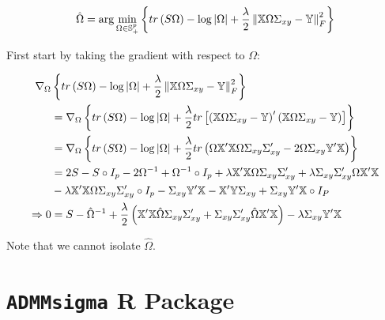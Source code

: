 \documentclass[11pt,]{report}
\theoremstyle{definition}
\theoremstyle{definition}
\theoremstyle{definition}
\theoremstyle{remark}
\begin{document}
\begin{equation}
\hat{\Omega} = \arg\min_{\Omega \in \mathbb{S}_{+}^{p}}\left\{ tr\left(S\Omega\right) - \log\left|\Omega\right| + \frac{\lambda}{2}\left\|\mathbb{X}\Omega\Sigma_{xy} - \mathbb{Y}\right\|_{F}^{2} \right\}
\label{eq:penregression2}\notag
\end{equation}

First start by taking the gradient with respect to \(\Omega\):

\begin{equation}
\begin{split}
  \nabla_{\Omega}&\left\{ tr\left(S\Omega\right) - \log\left|\Omega\right| + \frac{\lambda}{2}\left\|\mathbb{X}\Omega\Sigma_{xy} - \mathbb{Y}\right\|_{F}^{2} \right\} \\
  &= \nabla_{\Omega}\left\{ tr\left(S\Omega\right) - \log\left|\Omega\right| + \frac{\lambda}{2}tr\left[\left(\mathbb{X}\Omega\Sigma_{xy} - \mathbb{Y}\right)'\left(\mathbb{X}\Omega\Sigma_{xy} - \mathbb{Y}\right) \right] \right\} \\
  &= \nabla_{\Omega}\left\{ tr\left(S\Omega\right) - \log\left|\Omega\right| + \frac{\lambda}{2}tr\left(\Omega\mathbb{X}'\mathbb{X}\Omega\Sigma_{xy}\Sigma_{xy}' - 2\Omega\Sigma_{xy}\mathbb{Y}'\mathbb{X} \right) \right\} \\
  &= 2S - S\circ I_{p} - 2\Omega^{-1} + \Omega^{-1}\circ I_{p} + \lambda\mathbb{X}'\mathbb{X}\Omega\Sigma_{xy}\Sigma_{xy}' + \lambda\Sigma_{xy}\Sigma_{xy}'\Omega\mathbb{X}'\mathbb{X} \\
  &- \lambda\mathbb{X}'\mathbb{X}\Omega\Sigma_{xy}\Sigma_{xy}'\circ I_{p} - \Sigma_{xy}\mathbb{Y}'\mathbb{X} - \mathbb{X}'\mathbb{Y}\Sigma_{xy} + \Sigma_{xy}\mathbb{Y}'\mathbb{X}\circ I_{P} \\
  \Rightarrow 0 &= S - \hat{\Omega}^{-1} + \frac{\lambda}{2}\left(\mathbb{X}'\mathbb{X}\hat{\Omega}\Sigma_{xy}\Sigma_{xy}' + \Sigma_{xy}\Sigma_{xy}'\hat{\Omega}\mathbb{X}'\mathbb{X} \right) - \lambda\Sigma_{xy}\mathbb{Y}'\mathbb{X}
\end{split}
\label{eq:penregressionproof}\notag
\end{equation}

Note that we cannot isolate \(\hat{\Omega}\).

\hypertarget{admmsigma-r-package}{%
\chapter{\texorpdfstring{\texttt{ADMMsigma} R Package}{ADMMsigma R Package}}\label{admmsigma-r-package}}
\end{document}

